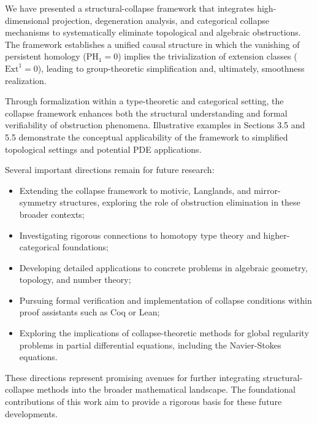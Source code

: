 \documentclass[11pt]{article}
\begin{document}
We have presented a structural-collapse framework that integrates high-dimensional projection, degeneration analysis, and categorical collapse mechanisms to systematically eliminate topological and algebraic obstructions. The framework establishes a unified causal structure in which the vanishing of persistent homology ($\mathrm{PH}_1=0$) implies the trivialization of extension classes ($\mathrm{Ext}^1=0$), leading to group-theoretic simplification and, ultimately, smoothness realization.

Through formalization within a type-theoretic and categorical setting, the collapse framework enhances both the structural understanding and formal verifiability of obstruction phenomena. Illustrative examples in Sections 3.5 and 5.5 demonstrate the conceptual applicability of the framework to simplified topological settings and potential PDE applications.

Several important directions remain for future research:

\begin{itemize}
    \item Extending the collapse framework to motivic, Langlands, and mirror-symmetry structures, exploring the role of obstruction elimination in these broader contexts;
    \item Investigating rigorous connections to homotopy type theory and higher-categorical foundations;
    \item Developing detailed applications to concrete problems in algebraic geometry, topology, and number theory;
    \item Pursuing formal verification and implementation of collapse conditions within proof assistants such as Coq or Lean;
    \item Exploring the implications of collapse-theoretic methods for global regularity problems in partial differential equations, including the Navier-Stokes equations.
\end{itemize}

These directions represent promising avenues for further integrating structural-collapse methods into the broader mathematical landscape. The foundational contributions of this work aim to provide a rigorous basis for these future developments.
\end{document}
